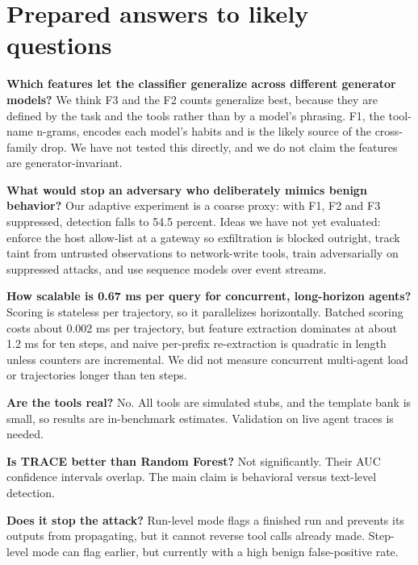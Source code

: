 \documentclass[11pt]{article}
\begin{document}
\newpage
\section*{Prepared answers to likely questions}
\textbf{Which features let the classifier generalize across different generator models?}
We think F3 and the F2 counts generalize best, because they are defined by the task and the tools rather than by a model's phrasing. F1, the tool-name n-grams, encodes each model's habits and is the likely source of the cross-family drop. We have not tested this directly, and we do not claim the features are generator-invariant.

\textbf{What would stop an adversary who deliberately mimics benign behavior?}
Our adaptive experiment is a coarse proxy: with F1, F2 and F3 suppressed, detection falls to 54.5 percent. Ideas we have not yet evaluated: enforce the host allow-list at a gateway so exfiltration is blocked outright, track taint from untrusted observations to network-write tools, train adversarially on suppressed attacks, and use sequence models over event streams.

\textbf{How scalable is 0.67 ms per query for concurrent, long-horizon agents?}
Scoring is stateless per trajectory, so it parallelizes horizontally. Batched scoring costs about 0.002 ms per trajectory, but feature extraction dominates at about 1.2 ms for ten steps, and naive per-prefix re-extraction is quadratic in length unless counters are incremental. We did not measure concurrent multi-agent load or trajectories longer than ten steps.

\textbf{Are the tools real?}
No. All tools are simulated stubs, and the template bank is small, so results are in-benchmark estimates. Validation on live agent traces is needed.

\textbf{Is TRACE better than Random Forest?}
Not significantly. Their AUC confidence intervals overlap. The main claim is behavioral versus text-level detection.

\textbf{Does it stop the attack?}
Run-level mode flags a finished run and prevents its outputs from propagating, but it cannot reverse tool calls already made. Step-level mode can flag earlier, but currently with a high benign false-positive rate.
\end{document}
